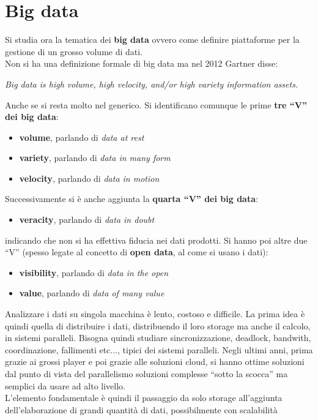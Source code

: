 \documentclass[a4paper,12pt, oneside]{book}
\begin{document}
\chapter{Big data}
Si studia ora la tematica dei \textbf{big data} ovvero come definire piattaforme
per la gestione di un grosso volume di dati.\\
Non si ha una definizione formale di big data ma nel 2012 Gartner disse:
\begin{center}
  \textit{Big data is high volume, high velocity, and/or high variety
    information assets.} 
\end{center}
Anche se si resta molto nel generico. Si identificano comunque le prime
\textbf{tre ``V'' dei big data}:
\begin{itemize}
  \item \textbf{volume}, parlando di \textit{data at rest}
  \item \textbf{variety}, parlando di \textit{data in many form}
  \item \textbf{velocity}, parlando di \textit{data in motion}
\end{itemize}
Successivamente si è anche aggiunta la \textbf{quarta ``V'' dei big data}:
\begin{itemize}
  \item \textbf{veracity}, parlando di \textit{data in doubt}
\end{itemize}
indicando che non si ha effettiva fiducia nei dati prodotti. Si hanno poi altre
due ``V'' (spesso legate al concetto di \textbf{open data}, al come si usano i
dati): 
\begin{itemize}
  \item \textbf{visibility}, parlando di \textit{data in the open}
  \item \textbf{value}, parlando di \textit{data of many value}
\end{itemize}
Analizzare i dati su singola macchina è lento, costoso e difficile. La prima
idea è quindi quella di distribuire i dati, distribuendo il loro storage ma
anche il calcolo, in sistemi paralleli. Bisogna quindi studiare
sincronizzazione, deadlock, bandwith, coordinazione, fallimenti etc$\ldots$,
tipici dei sistemi paralleli. Negli ultimi anni, prima grazie ai grossi player e
poi grazie alle soluzioni cloud, si hanno ottime soluzioni dal punto di vista
del parallelismo soluzioni complesse ``sotto la scocca'' ma semplici da usare ad
alto livello.\\ 
L'elemento fondamentale è quindi il passaggio da solo storage all'aggiunta
dell'elaborazione di grandi quantità di dati, possibilmente con scalabilità
\end{document}
